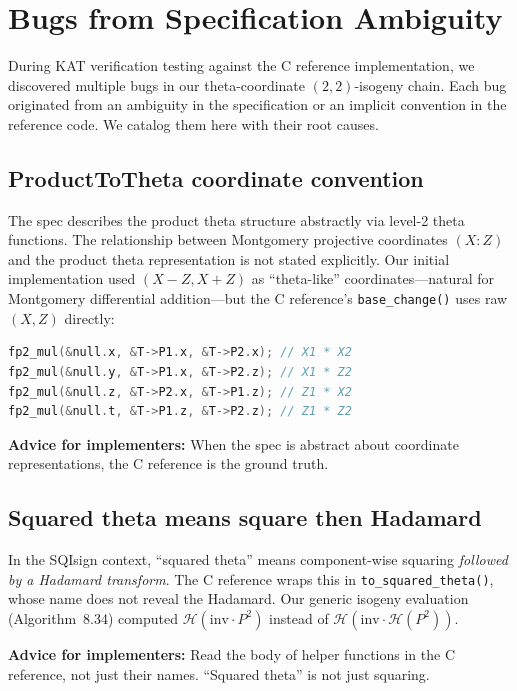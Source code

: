 \section{Bugs from Specification Ambiguity}
\label{sec:bugs}

During KAT verification testing against the C reference implementation,
we discovered multiple bugs in our theta-coordinate $(2,2)$-isogeny
chain.  Each bug originated from an ambiguity in the specification or
an implicit convention in the reference code.  We catalog them here
with their root causes.

\subsection{ProductToTheta coordinate convention}
\label{sec:bug-product-to-theta}

The spec describes the product theta structure abstractly via
level-2 theta functions.  The relationship between Montgomery
projective coordinates $(X:Z)$ and the product theta representation
is not stated explicitly.  Our initial implementation used
$(X-Z, X+Z)$ as ``theta-like'' coordinates---natural for Montgomery
differential addition---but the C reference's \texttt{base\_change()}
uses raw $(X, Z)$ directly:
\begin{lstlisting}[language=C]
fp2_mul(&null.x, &T->P1.x, &T->P2.x); // X1 * X2
fp2_mul(&null.y, &T->P1.x, &T->P2.z); // X1 * Z2
fp2_mul(&null.z, &T->P2.x, &T->P1.z); // Z1 * X2
fp2_mul(&null.t, &T->P1.z, &T->P2.z); // Z1 * Z2
\end{lstlisting}

\noindent
\textbf{Advice for implementers:} When the spec is abstract about coordinate
representations, the C reference is the ground truth.

\subsection{Squared theta means square then Hadamard}
\label{sec:bug-squared-theta}

In the SQIsign context, ``squared theta'' means component-wise
squaring \emph{followed by a Hadamard transform}.  The C reference
wraps this in \texttt{to\_squared\_theta()}, whose name does not
reveal the Hadamard.  Our generic isogeny evaluation (Algorithm~8.34)
computed $\mathcal{H}(\mathrm{inv} \cdot P^2)$ instead of
$\mathcal{H}(\mathrm{inv} \cdot \mathcal{H}(P^2))$.

\noindent
\textbf{Advice for implementers:} Read the body of helper functions in the C reference,
not just their names.  ``Squared theta'' is not just squaring.

